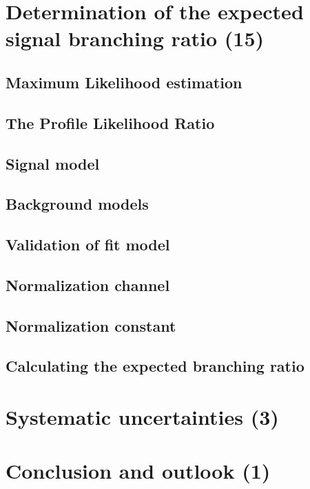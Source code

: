 \chapter{Determination of the expected signal branching ratio (15)}

\section{Maximum Likelihood estimation}

\section{The Profile Likelihood Ratio}

\section{Signal model}

\section{Background models}

\section{Validation of fit model}

\section{Normalization channel}

\section{Normalization constant}

\section{Calculating the expected branching ratio}

\chapter{Systematic uncertainties (3)}

\chapter{Conclusion and outlook (1)}

